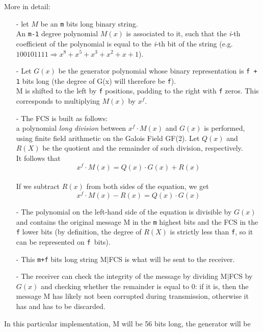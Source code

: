 \noindent More in detail:
\begin{itemize}[leftmargin=0pt, topsep=0pt,itemsep=-1ex,partopsep=1ex,parsep=1ex]
	\item[-] let $M$ be an \texttt{m} bits long binary string.\\
	An \texttt{m-1} degree polynomial $M(x)$ is associated to it, such that the \textit{i}-th coefficient of the polynomial is equal to the \textit{i}-th bit of the string (e.g. $100101111 \Rightarrow x^{8} + x^{5} + x^{3} + x^{2} + x + 1$).\\
	\item[-] Let $G(x)$ be the generator polynomial whose binary representation is \texttt{f + 1} bits long (the degree of G(x) will therefore be \texttt{f}).\\
M is shifted to the left by \texttt{f} positions, padding to the right with \texttt{f} zeros. This corresponds to multiplying $M(x)$ by $x^f$.\\
	\item[-] The FCS is built as follows:\\
	a polynomial \textit{long division} between $x^{f}{\cdot}M(x)$ and $G(x)$ is performed, using finite field arithmetic on the Galois Field GF(2). Let $Q(x)$ and $R(X)$ be the quotient and the remainder of such division, respectively. \\
	It follows that 
	\begin{equation}
		x^{f}{\cdot}M(x) = Q(x)\cdot G(x) + R(x)
		\label{eq:polynomial1}
	\end{equation}
\\
	If we subtract $R(x)$ from both sides of the equation, we get
	\begin{equation}
			x^{f}{\cdot}M(x) - R(x) = Q(x)\cdot G(x)
			\label{eq:polynomial2}
	\end{equation}
	\item[-] The polynomial on the left-hand side of the equation is divisible by $G(x)$ and contains the original message M in the \texttt{m} highest bits and the FCS in the \texttt{f} lower bits (by definition, the degree of $R(X)$ is strictly less than \texttt{f}, so it can be represented on \texttt{f }bits).\\
	\item[-] This \texttt{m+f} bits long string M{$|$}FCS is what will be sent to the receiver.\\
	\item[-] The receiver can check the integrity of the message by dividing M{$|$}FCS by $G(x)$ and checking whether the remainder is equal to 0: if it is, then the message M has likely not been corrupted during transmission, otherwise it has and has to be discarded.
\end{itemize}
\hfill \break
In this particular implementation, M will be 56 bits long, the generator will be

